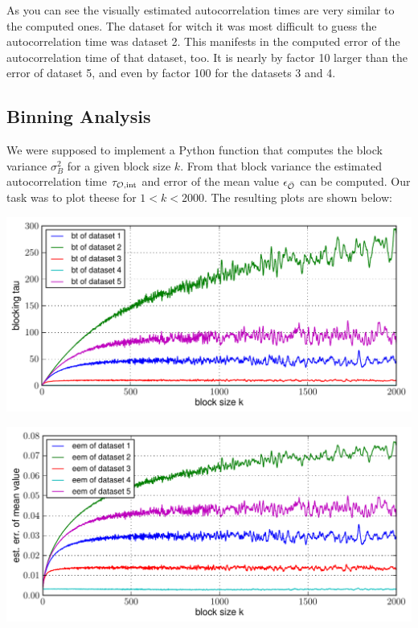 \documentclass[12pt,a4paper]{scrartcl}
\begin{document}
As you can see the visually estimated autocorrelation times are very similar to the computed ones. The dataset for witch it was most difficult to guess the autocorrelation time was dataset 2. This manifests in the computed error of the autocorrelation time of that dataset, too. It is nearly by factor 10 larger than the error of dataset 5, and even by factor 100 for the datasets 3 and 4.

\subsection{Binning Analysis}
We were supposed to implement a Python function that computes the block variance $\sigma^2_B$ for a given block size $k$. From that block variance the estimated autocorrelation time $\tau_{\cal{O},\text{int}}$ and error of the mean value $\epsilon_{\bar{\cal O} {}}$ can be computed. Our task was to plot theese for $1<k<2000$. The resulting plots are shown below:

\begin{minipage}[hbt]{15cm}
	\centering
	\includegraphics[width=16cm]{../plots/blockingtau.pdf}
\end{minipage}

\begin{minipage}[hbt]{15cm}
	\centering
	\includegraphics[width=16cm]{../plots/eem.pdf}
\end{minipage}
\end{document}

